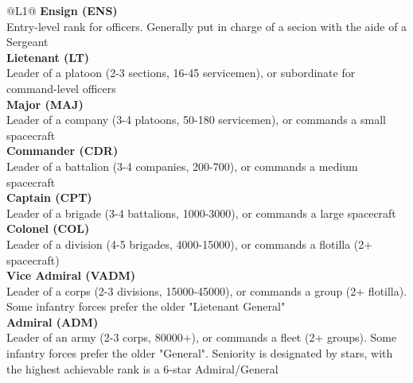 \begin{redtable}{\linewidth}{@{}L{1}@{}}
  \textbf{Ensign (ENS)}\\
  Entry-level rank for officers. Generally put in charge of a secion with the aide of a Sergeant\\
  \textbf{Lietenant (LT)}\\
  Leader of a platoon (2-3 sections, 16-45 servicemen), or subordinate for command-level officers\\
  \textbf{Major (MAJ)}\\
  Leader of a company (3-4 platoons, 50-180 servicemen), or commands a small spacecraft\\
  \textbf{Commander (CDR)}\\
  Leader of a battalion (3-4 companies, 200-700), or commands a medium spacecraft\\
  \textbf{Captain (CPT)}\\
  Leader of a brigade (3-4 battalions, 1000-3000), or commands a large spacecraft\\
  \textbf{Colonel (COL)}\\
  Leader of a division (4-5 brigades, 4000-15000), or commands a flotilla (2+ spacecraft)\\
  \textbf{Vice Admiral (VADM)}\\
  Leader of a corps (2-3 divisions, 15000-45000), or commands a group (2+ flotilla). Some infantry forces prefer the older "Lietenant General"\\
  \textbf{Admiral (ADM)}\\
  Leader of an army (2-3 corps, 80000+), or commands a fleet (2+ groups). Some infantry forces prefer the older "General". Seniority is designated by stars, with the highest achievable rank is a 6-star Admiral/General\\
\end{redtable}
